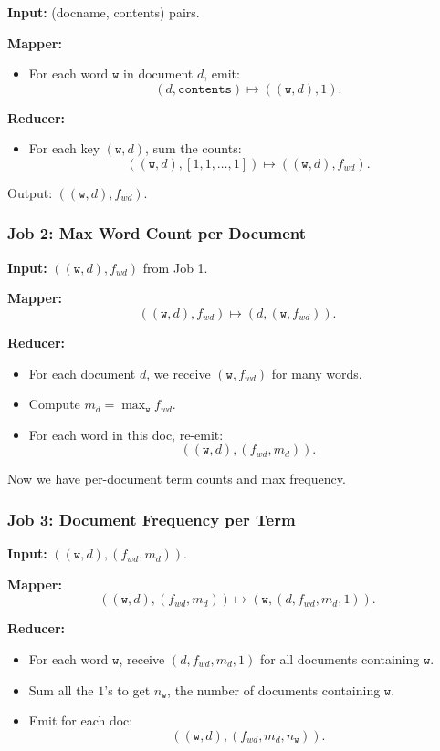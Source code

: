 \documentclass[11pt]{article}
\begin{document}
\textbf{Input:} (docname, contents) pairs.

\textbf{Mapper:}
\begin{itemize}
    \item For each word $\texttt{w}$ in document $d$, emit:
    \[
        (d, \texttt{contents}) \mapsto ((\texttt{w}, d), 1).
    \]
\end{itemize}

\textbf{Reducer:}
\begin{itemize}
    \item For each key $(\texttt{w}, d)$, sum the counts:
    \[
        ((\texttt{w}, d), [1,1,\dots,1]) \mapsto ((\texttt{w}, d), f_{wd}).
    \]
\end{itemize}

Output: $((\texttt{w}, d), f_{wd})$.

\subsubsection*{Job 2: Max Word Count per Document}

\textbf{Input:} $((\texttt{w}, d), f_{wd})$ from Job 1.

\textbf{Mapper:}
\[
    ((\texttt{w}, d), f_{wd}) \mapsto (d, (\texttt{w}, f_{wd})).
\]

\textbf{Reducer:}
\begin{itemize}
    \item For each document $d$, we receive $(\texttt{w}, f_{wd})$ for many words.
    \item Compute $m_d = \max_{\texttt{w}} f_{wd}$.
    \item For each word in this doc, re-emit:
    \[
        ((\texttt{w}, d), (f_{wd}, m_d)).
    \]
\end{itemize}

Now we have per-document term counts and max frequency.

\subsubsection*{Job 3: Document Frequency per Term}

\textbf{Input:} $((\texttt{w}, d), (f_{wd}, m_d))$.

\textbf{Mapper:}
\[
    ((\texttt{w}, d), (f_{wd}, m_d)) \mapsto (\texttt{w}, (d, f_{wd}, m_d, 1)).
\]

\textbf{Reducer:}
\begin{itemize}
    \item For each word $\texttt{w}$, receive $(d, f_{wd}, m_d, 1)$ for all documents containing $\texttt{w}$.
    \item Sum all the $1$'s to get $n_{\texttt{w}}$, the number of documents containing $\texttt{w}$.
    \item Emit for each doc:
    \[
        ((\texttt{w}, d), (f_{wd}, m_d, n_{\texttt{w}})).
    \]
\end{itemize}
\end{document}
